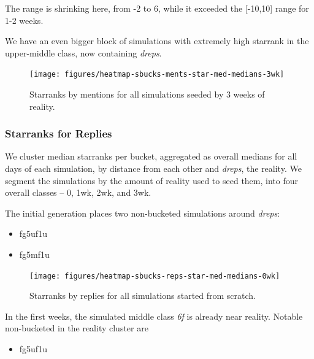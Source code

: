 \documentclass[10pt,oneside]{memoir}
\begin{document}
\begin{Spacing}{2}
The range is shrinking here, from -2 to 6, while it exceeded the [-10,10] range for 1-2 weeks.


We have an even bigger block of simulations with extremely high starrank in the upper-middle class, now containing {\itshape dreps}.



\begin{figure}
\begin{center}
    \texttt{[image: figures/heatmap-sbucks-ments-star-med-medians-3wk]}
    \caption{Starranks by mentions for all simulations seeded by 3 weeks of reality.}
    \label{figure:heatmap-sbucks-ments-star-med-medians-3wk}
\end{center}
\end{figure}
\pagebreak \subsubsection{Starranks for Replies}
\label{starranksforreplies}

We cluster median starranks per bucket, aggregated as overall medians for all days of each simulation, by distance from each other and {\itshape dreps}, the reality.  We segment the simulations by the amount of reality used to seed them, into four overall classes -- 0, 1wk, 2wk, and 3wk.


The initial generation places two non-bucketed simulations around {\itshape dreps}:


\begin{itemize}


\item fg5uf1u

\item fg5mf1u
\end{itemize}


\begin{figure}
\begin{center}
    \texttt{[image: figures/heatmap-sbucks-reps-star-med-medians-0wk]}
    \caption{Starranks by replies for all simulations started from scratch.}
    \label{figure:heatmap-sbucks-reps-star-med-medians-0wk}
\end{center}
\end{figure}
In the first weeks, the simulated middle class {\itshape 6f} is already near reality.
Notable non-bucketed in the reality cluster are


\begin{itemize}


\item fg5uf1u


\end{itemize}
\end{Spacing}
\end{document}
